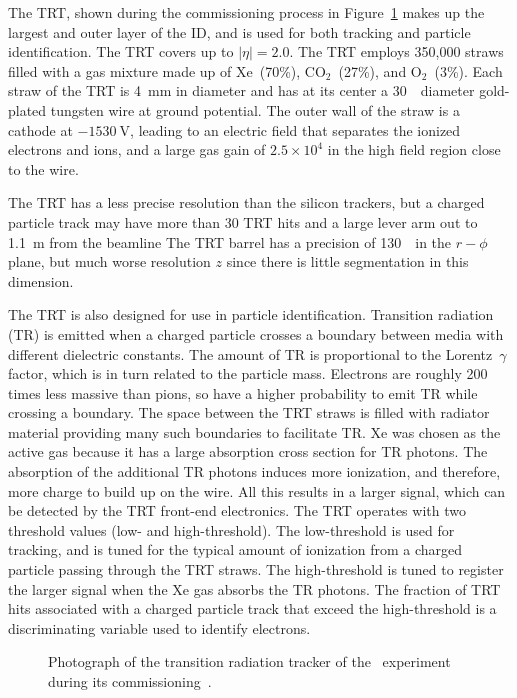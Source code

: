 The TRT, shown during the commissioning process in Figure~\ref{fig:trt_module}
makes up the largest and outer layer of the ID, and is used for both tracking
and particle identification.
The TRT covers up to $|\eta| = 2.0$.
The TRT employs 350,000 straws filled with a gas mixture made up of
Xe~(70\%), $\text{CO}_2$~(27\%), and $\text{O}_2$~(3\%).
Each straw of the TRT is 4~mm in diameter and has at its center a
30~\um\ diameter gold-plated tungsten wire at ground potential.
The outer wall of the straw is a cathode at $-1530~\mathrm{V}$, leading to
an electric field that separates the ionized electrons and ions, and a large
gas gain of $2.5 \times 10^{4}$ in the high field region close to the wire.

The TRT has a less precise resolution than the silicon trackers, but a charged
particle track may have more than 30 TRT hits and a large lever arm out
to 1.1~m from the beamline
The TRT barrel has a precision of 130~\um\  in the $r-\phi$ plane, but much
worse resolution $z$ since there is little segmentation in this dimension.

The TRT is also designed for use in particle identification.
Transition radiation (TR) is emitted when a charged particle crosses a boundary
between media with different dielectric constants.
The amount of TR is proportional to the Lorentz~$\gamma$ factor, which is in
turn related to the particle mass.
Electrons are roughly 200 times less massive than pions, so have a higher
probability to emit TR while crossing a boundary.
The space between the TRT straws is filled with radiator material providing
many such boundaries to facilitate TR.
Xe was chosen as the active gas because it has a large absorption cross section
for TR photons.
The absorption of the additional TR photons induces more ionization, and
therefore, more charge to build up on the wire.
All this results in a larger signal, which can be detected by the TRT
front-end electronics.
The TRT operates with two threshold values (low- and high-threshold).
The low-threshold is used for tracking, and is tuned for the typical amount of
ionization from a charged particle passing through the TRT straws.
The high-threshold is tuned to register the larger signal when the Xe gas
absorbs the TR photons.
The fraction of TRT hits associated with a charged particle track that exceed
the high-threshold is a discriminating variable used to identify electrons.

\begin{figure}[t!]
  \caption{
    Photograph of the transition radiation tracker of the
    \atlas\ experiment during its commissioning~\cite{Maximilien:889555}.
  }
  \label{fig:trt_module}
\end{figure}

